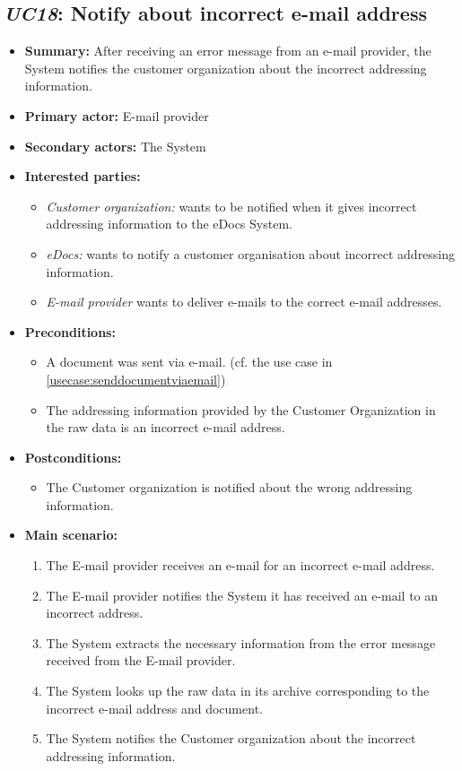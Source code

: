 \documentclass[a4paper,10pt]{article}
\begin{document}
\subsection{\emph{UC18}: Notify about incorrect e-mail address}
\begin{itemize}
    \item \textbf{Summary:} After receiving an error message from an e-mail provider, the System notifies the customer organization about the incorrect addressing information.
    \item \textbf{Primary actor:} E-mail provider
	\item \textbf{Secondary actors:} The System
    \item \textbf{Interested parties:} 
        \begin{itemize}
            \item \textit{Customer organization:} wants to be notified when it gives incorrect addressing information to the eDocs System.
            \item \textit{eDocs:} wants to notify a customer organisation about incorrect addressing information.
            \item \textit{E-mail provider} wants to deliver e-mails to the correct e-mail addresses.
        \end{itemize}

    \item \textbf{Preconditions:}
        \begin{itemize}
            \item A document was sent via e-mail. (cf. the use case in \ref{usecase:senddocumentviaemail})
            \item The addressing information provided by the Customer Organization in the raw data is an incorrect e-mail address.
        \end{itemize}

    \item \textbf{Postconditions:}
        \begin{itemize}
            \item The Customer organization is notified about the wrong addressing information.
        \end{itemize}
        
    \item \textbf{Main scenario:} 
    \begin{enumerate}
       \item The E-mail provider receives an e-mail for an incorrect e-mail address.
       \item The E-mail provider notifies the System it has received an e-mail to an incorrect address.
       \item The System extracts the necessary information from the error message received from the E-mail provider.
       \item The System looks up the raw data in its archive corresponding to the incorrect e-mail address and document.
       \item The System notifies the Customer organization about the incorrect addressing information.
    \end{enumerate}
\end{itemize}
\end{document}
